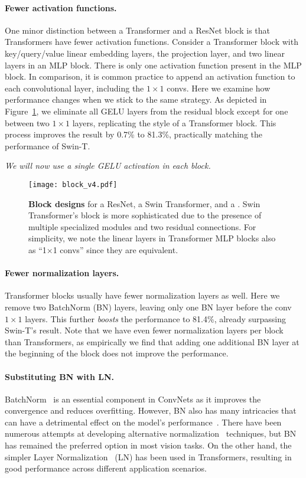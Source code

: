 \paragraph{Fewer activation functions.}
One minor distinction between a Transformer and a ResNet block is that Transformers have fewer activation functions. Consider a Transformer block with key/query/value linear embedding layers, the projection layer, and two linear layers in an MLP block. There is only one activation function present in the MLP block. In comparison, it is common practice to append an activation function to each convolutional layer, including the $1\times1$ convs. Here we examine how performance changes when we stick to the same strategy. As depicted in Figure~\ref{fig:block}, we eliminate all GELU layers from the residual block except for one between two $1\times1$ layers, replicating the style of a Transformer block. This process improves the result by 0.7\% to 81.3\%, practically matching the performance of Swin-T. 


\textit{We will now use a single GELU activation in each block.}

\begin{figure}[t]
\centering
\texttt{[image: block\_v4.pdf]}
\caption{\textbf{Block designs} for a ResNet, a Swin Transformer, and a \cnn. Swin Transformer's block is more sophisticated due to the presence of multiple specialized modules and two residual connections. For simplicity, we note the linear layers in Transformer MLP blocks also as ``1$\times$1 convs'' since they are equivalent.}
\label{fig:block}
\end{figure}

\paragraph{Fewer normalization layers.}
Transformer blocks usually have fewer normalization layers as well. Here we remove two BatchNorm (BN) layers, leaving only one BN layer before the conv $1\times1$ layers. This further \textit{boosts} the performance to 81.4\%, already surpassing Swin-T's result. Note that we have even fewer normalization layers per block than Transformers, as empirically we find that adding one additional BN layer at the beginning of the block does not improve the performance. 

\paragraph{Substituting BN with LN.}
BatchNorm~\cite{Ioffe2017} is an essential component in ConvNets as it improves the convergence and reduces overfitting. However, BN also has many intricacies that can have a detrimental effect on the model's performance~\cite{wu2021rethinking}. There have been numerous attempts at developing alternative normalization~\cite{Salimans2016,Ulyanov2016,Wu2018} techniques, but BN has remained the preferred option in most vision tasks.
On the other hand, the simpler Layer Normalization~\cite{Ba2016} (LN) has been used in Transformers, resulting in good performance across different application scenarios.

